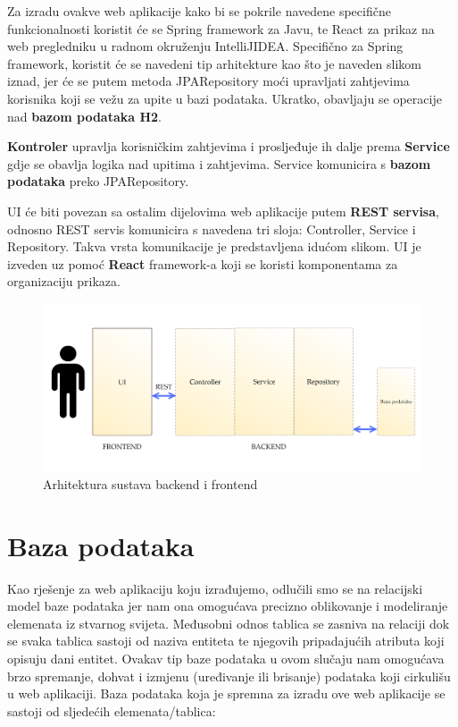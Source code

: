 \textnormal{Za izradu ovakve web aplikacije kako bi se pokrile navedene specifične funkcionalnosti koristit će se Spring framework za Javu, te React za prikaz na web pregledniku u radnom okruženju IntelliJIDEA.
	Specifično za Spring framework, koristit će se navedeni tip arhitekture kao što je naveden slikom iznad, jer će se putem metoda JPARepository moći upravljati zahtjevima korisnika koji se vežu za upite u bazi podataka.
	Ukratko, obavljaju se operacije nad \textbf{bazom podataka H2}.}

\textnormal{\textbf{Kontroler} upravlja korisničkim zahtjevima i prosljeđuje ih dalje prema \textbf{Service} gdje se obavlja logika nad upitima i zahtjevima. Service komunicira s \textbf{bazom podataka} preko JPARepository.}

\textnormal{UI će biti povezan sa ostalim dijelovima web aplikacije putem \textbf{REST servisa}, odnosno REST servis komunicira s navedena tri sloja: Controller, Service i Repository. Takva vrsta komunikacije je predstavljena idućom slikom.
	UI je izveden uz pomoć \textbf{React} framework-a koji se koristi komponentama za organizaciju prikaza.}

\begin{figure}[H]
	\includegraphics[width=\textwidth]{slike/arhitekturaSustava3.png} %
	\centering
	\caption{Arhitektura sustava backend i frontend}
	\label{fig:arhitekturasustava3}
\end{figure}

\eject





\section{Baza podataka}


\textnormal{Kao rješenje za web aplikaciju koju izrađujemo, odlučili smo se na relacijski model baze podataka jer nam ona omogućava precizno oblikovanje i modeliranje elemenata iz stvarnog svijeta. Međusobni odnos tablica se zasniva na relaciji dok se svaka tablica sastoji od naziva entiteta te njegovih pripadajućih atributa koji opisuju dani entitet. Ovakav tip baze podataka u ovom slučaju nam omogućava brzo spremanje, dohvat i izmjenu (uređivanje ili brisanje) podataka koji cirkulišu u web aplikaciji. Baza podataka koja je spremna za izradu ove web aplikacije se sastoji od sljedećih elemenata/tablica:}

